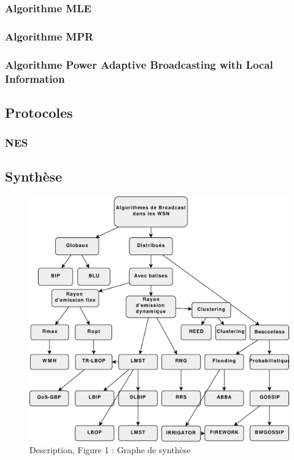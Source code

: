 \subsubsection{Algorithme MLE}
\cite{Cheng06}
\subsubsection{Algorithme MPR}

\subsubsection{Algorithme Power Adaptive Broadcasting with Local Information}
\cite{chen2003}



\subsection{Protocoles}
\subsubsection{NES}

\newpage
\subsection{Synthèse}



\newpage

\begin{figure}[H]
\centering
\includegraphics[scale=1,angle=90]{source/classification}
\caption{Description, Figure 1 : Graphe de synthèse}
\end{figure} 

